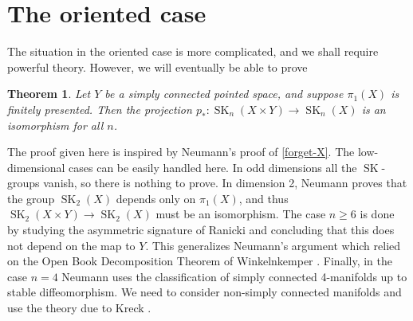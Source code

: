 \documentclass{amsart}
\newtheorem{thm}{Theorem}[section]
\theoremstyle{definition}
\theoremstyle{remark}
\newcommand{\SK}{\operatorname{SK}}
\begin{document}
\section{The oriented case} \label{section-ori}

The situation in the oriented case is more complicated, and we shall require powerful theory. However, we will eventually be able to prove

\begin{thm}
\label{forget-Y}
    Let $Y$ be a simply connected pointed space, and suppose $\pi_1(X)$ is finitely presented. Then the projection $p_*:\SK_n(X\times Y)\to\SK_n(X)$ is an isomorphism for all $n$.
\end{thm}

The proof given here is inspired by Neumann's proof of \cref{forget-X}. The low-dimensional cases can be easily handled here. In odd dimensions all the $\SK$-groups vanish, so there is nothing to prove. In dimension 2, Neumann \cite[Thm 2]{neumann1975} proves that the group $\SK_2(X)$ depends only on $\pi_1(X)$, and thus $\SK_2(X\times Y)\to\SK_2(X)$ must be an isomorphism. The case $n \geq 6$ is done by studying the asymmetric signature of Ranicki \cite{ranicki2013high} and concluding that this does not depend on the map to $Y$. This generalizes Neumann's argument which relied on the Open Book Decomposition Theorem of Winkelnkemper \cite{winkelnkemper-obd}. Finally, in the case $n=4$ Neumann uses the classification of simply connected 4-manifolds up to stable diffeomorphism. We need to consider non-simply connected manifolds and use the theory due to Kreck \cite{kreck1999surgery}.
\end{document}
